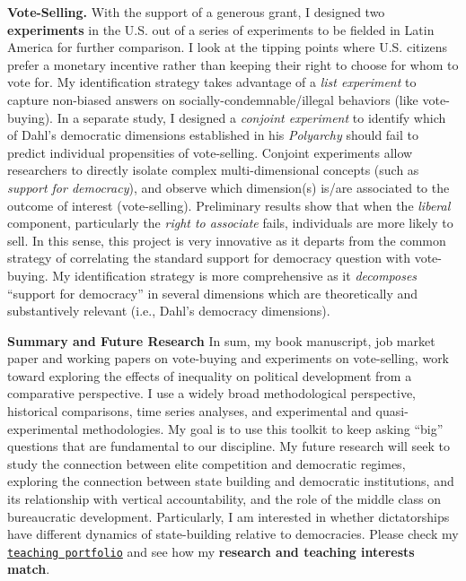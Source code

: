 \documentclass[10pt,stdletter,dateno,sigleft]{newlfm} %
\begin{document}
\begin{newlfm}
{\bf Vote-Selling.} With the support of a generous grant, I designed two {\bf experiments} in the U.S. out of a series of experiments to be fielded in Latin America for further comparison. I look at the tipping points where U.S. citizens prefer a monetary incentive rather than keeping their right to choose for whom to vote for. My identification strategy takes advantage of a \emph{list experiment} to capture non-biased answers on socially-condemnable/illegal behaviors (like vote-buying). In a separate study, I designed a \emph{conjoint experiment} to identify which of Dahl's democratic dimensions established in his \emph{Polyarchy} should fail to predict individual propensities of vote-selling. Conjoint experiments allow researchers to directly isolate complex multi-dimensional concepts (such as \emph{support for democracy}), and observe which dimension(s) is/are associated to the outcome of interest (vote-selling). Preliminary results show that when the \emph{liberal} component, particularly the \emph{right to associate} fails, individuals are more likely to sell. In this sense, this project is very innovative as it departs from the common strategy of correlating the standard support for democracy question with vote-buying. My identification strategy is more comprehensive as it \emph{decomposes} ``support for democracy'' in several dimensions which are theoretically and substantively relevant (i.e., Dahl's democracy dimensions). 


{\bf Summary and Future Research} In sum, my book manuscript, job market paper and working papers on vote-buying and experiments on vote-selling, work toward exploring the effects of inequality on political development from a comparative perspective. I use a widely broad methodological perspective, historical comparisons, time series analyses, and experimental and quasi-experimental methodologies. My goal is to use this toolkit to keep asking ``big'' questions that are fundamental to our discipline. My future research will seek to study the connection between elite competition and democratic regimes, exploring the connection between state building and democratic institutions, and its relationship with vertical accountability, and the role of the middle class on bureaucratic development. Particularly, I am interested in whether dictatorships have different dynamics of state-building relative to democracies. Please check my \href{http://www.hectorbahamonde.com/teaching/}{\texttt{teaching portfolio}} and see how my {\bf research and teaching interests match}.


{\unskip}


\vspace{-10cm}



\end{newlfm}
\end{document}
